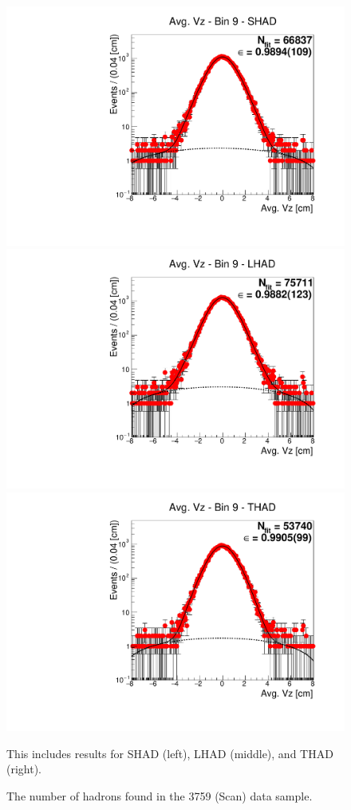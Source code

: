 \begin{figure}[H]
\centering
\includegraphics[scale=0.25]{figures/plots/nonDDbar_fit_results/scan/fit_scan_09_data_SHAD.pdf}
\hspace{-0.5cm}
\includegraphics[scale=0.25]{figures/plots/nonDDbar_fit_results/scan/fit_scan_09_data_LHAD.pdf}
\hspace{-0.5cm}
\includegraphics[scale=0.25]{figures/plots/nonDDbar_fit_results/scan/fit_scan_09_data_THAD.pdf}
\caption{The number of hadrons found in the 3759 (Scan) data sample.}
{This includes results for SHAD (left), LHAD (middle), and THAD (right).}
\label{fig:hadron_fits_scan_09}
\end{figure}

